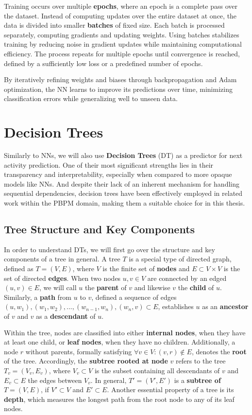 Training occurs over multiple \textbf{epochs}, where an epoch is a complete pass over the dataset.
Instead of computing updates over the entire dataset at once, the data is divided into smaller \textbf{batches} of fixed size.
Each batch is processed separately, computing gradients and updating weights.
Using batches stabilizes training by reducing noise in gradient updates while maintaining computational efficiency.
The process repeats for multiple epochs until convergence is reached, defined by a sufficiently low loss or a predefined number of epochs.  

By iteratively refining weights and biases through backpropagation and Adam optimization,
the NN learns to improve its predictions over time, minimizing classification errors while generalizing well to unseen data.  


\section{Decision Trees}
\label{sec:dt}
Similarly to NNs, we will also use \textbf{Decision Trees} (DT) \cite{decision_trees} as a predictor for next activity prediction.
One of their most significant strengths lies in their transparency and interpretability,
especially when compared to more opaque models like NNs.
And despite their lack of an inherent mechanism for handling sequential dependencies,
decision trees have been effectively employed in related work \cite{fairness_foundation} within the PBPM domain,
making them a suitable choice for in this thesis. 

\subsection{Tree Structure and Key Components}
In order to understand DTs, we will first go over the structure and key components of a tree in general.
\cite{trees}
A tree $T$ is a special type of directed graph, defined as $T=(V,E)$,
where $V$ is the finite set of \textbf{nodes} and $E \subset V \times V$ is the set of directed \textbf{edges}.
When two nodes $u,v \in V$ are connected by an edged $(u,v) \in E$,
we will call $u$ the \textbf{parent} of $v$ and likewise $v$ the \textbf{child} of $u$.
Similarly, a \textbf{path} from $u$ to $v$,
defined a sequence of edges $(u,w_1), (w_1,w_2), ..., (w_{n-1},w_n),(w_n, v) \subset E$,
establishes $u$ as an \textbf{ancestor} of $v$ and $v$ as a \textbf{descendant} of $u$.

Within the tree, nodes are classified into either \textbf{internal nodes},
when they have at least one child, or \textbf{leaf nodes},
when they have no children.
Additionally, a node $r$ without parents, formally satisfying $\forall v \in V: (v,r) \notin E$,
denotes the \textbf{root} of the tree.
Accordingly, the \textbf{subtree rooted at node} $v$ refers to the tree $T_v = (V_v, E_v)$,
where $V_v \subset V$ is the subset containing all descendants of $v$ 
and $E_v \subset E$ the edges between $V_v$.
In general, $T' = (V', E')$ is a \textbf{subtree of} $T = (V, E)$,
if $V' \subset V$ and $E' \subset E$.
Another essential property of a tree is its \textbf{depth},
which measures the longest path from the root node to any of its leaf nodes.

